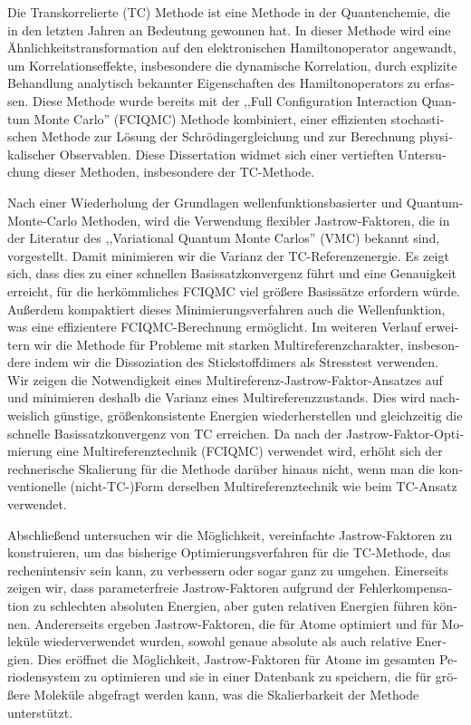 \cleardoublepage
\begin{otherlanguage}{ngerman}

Die Transkorrelierte (TC) Methode ist eine Methode in der Quantenchemie, die in den letzten Jahren an Bedeutung gewonnen hat. In dieser Methode wird eine Ähnlichkeitstransformation auf den elektronischen Hamiltonoperator angewandt, um Korrelationseffekte, insbesondere die dynamische Korrelation, durch explizite Behandlung analytisch bekannter Eigenschaften des Hamiltonoperators zu erfassen. Diese Methode wurde bereits mit der ,,Full Configuration Interaction Quantum Monte Carlo'' (FCIQMC) Methode kombiniert, einer effizienten stochastischen Methode zur Lösung der Schrödingergleichung und zur Berechnung physikalischer Observablen. Diese Dissertation widmet sich einer vertieften Untersuchung dieser Methoden, insbesondere der TC-Methode.

Nach einer Wiederholung der Grundlagen wellenfunktionsbasierter und Quantum-Monte-Carlo Methoden, wird die Verwendung flexibler Jastrow-Faktoren, die in der Literatur des ,,Variational Quantum Monte Carlos'' (VMC) bekannt sind, vorgestellt. Damit minimieren wir die Varianz der TC-Referenzenergie. Es zeigt sich, dass dies zu einer schnellen Basissatzkonvergenz führt und eine Genauigkeit erreicht, für die herkömmliches FCIQMC viel größere Basissätze erfordern würde. Außerdem kompaktiert dieses Minimierungsverfahren auch die Wellenfunktion, was eine effizientere FCIQMC-Berechnung ermöglicht. Im weiteren Verlauf erweitern wir die Methode für Probleme mit starken Multireferenzcharakter, insbesondere indem wir die Dissoziation des Stickstoffdimers als Stresstest verwenden. Wir zeigen die Notwendigkeit eines Multireferenz-Jastrow-Faktor-Ansatzes auf und minimieren deshalb die Varianz eines Multireferenzzustands. Dies wird nachweislich günstige, größenkonsistente Energien wiederherstellen und gleichzeitig die schnelle Basissatzkonvergenz von TC erreichen. Da nach der Jastrow-Faktor-Optimierung eine Multireferenztechnik (FCIQMC) verwendet wird, erhöht sich der rechnerische Skalierung für die Methode darüber hinaus nicht, wenn man die konventionelle (nicht-TC-)Form derselben Multireferenztechnik wie beim TC-Ansatz verwendet.

Abschließend untersuchen wir die Möglichkeit, vereinfachte Jastrow-Faktoren zu konstruieren, um das bisherige Optimierungsverfahren für die TC-Methode, das rechenintensiv sein kann, zu verbessern oder sogar ganz zu umgehen. Einerseits zeigen wir, dass parameterfreie Jastrow-Faktoren aufgrund der Fehlerkompensation zu schlechten absoluten Energien, aber guten relativen Energien führen können. Andererseits ergeben Jastrow-Faktoren, die für Atome optimiert und für Moleküle wiederverwendet wurden, sowohl genaue absolute als auch relative Energien. Dies eröffnet die Möglichkeit, Jastrow-Faktoren für Atome im gesamten Periodensystem zu optimieren und sie in einer Datenbank zu speichern, die für größere Moleküle abgefragt werden kann, was die Skalierbarkeit der Methode unterstützt.

\end{otherlanguage}

